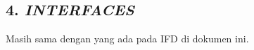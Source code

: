 \subsection*{\textcolor{subsectioncolor}{\textsf{4. \textit{INTERFACES}}}}

Masih sama dengan yang ada pada IFD di dokumen ini.
